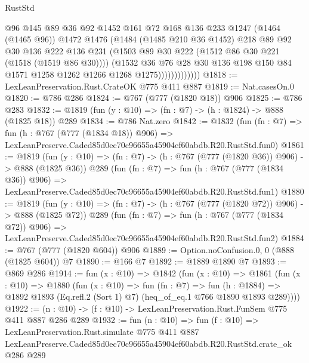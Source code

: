 \begin{lexlean}{RustStd}
\begin{coremodule}
                          @96
                          @145
                          @89
                          @36
                          @92
                          @1452
                          @161
                          @72
                          @168
                          @136
                          @233
                          @1247
                          (@1464 (@1465 @96))
                          @1472
                          @1476
                          (@1484
                            (@1485 @210 @36 @1452)
                            @218
                            @89
                            @92
                            @30
                            @136
                            @222
                            @136
                            @231
                            (@1503 @89 @30 @222 (@1512 @86 @30 @221 (@1518 (@1519 @86 @30))))
                            (@1532
                              @36
                              @76
                              @28
                              @30
                              @136
                              @198
                              @150
                              @84
                              @1571
                              @1258
                              @1262
                              @1266
                              @1268
                              @1275)))))))))))))
@1818 := LexLeanPreservation.Rust.CrateOK @775 @411 @887
@1819 := Nat.casesOn.{0}
@1820 := @786 @286
@1824 := @767 (@777 (@1820 @18)) @906
@1825 := @786 @283
@1832 := @1819 (fun (y : @10) => (fn : @7) -> (h : @1824) -> @888 (@1825 @18)) @289
@1834 := @786 Nat.zero
@1842 := @1832
    (fun (fn : @7) =>
    fun (h : @767 (@777 (@1834 @18)) @906) =>
    LexLeanPreserve.Caded85d0ec70c96655a45904ef60abdb.R20.RustStd.fun0)
@1861 := @1819
    (fun (y : @10) => (fn : @7) -> (h : @767 (@777 (@1820 @36)) @906) -> @888 (@1825 @36))
    @289
    (fun (fn : @7) =>
    fun (h : @767 (@777 (@1834 @36)) @906) =>
    LexLeanPreserve.Caded85d0ec70c96655a45904ef60abdb.R20.RustStd.fun1)
@1880 := @1819
    (fun (y : @10) => (fn : @7) -> (h : @767 (@777 (@1820 @72)) @906) -> @888 (@1825 @72))
    @289
    (fun (fn : @7) =>
    fun (h : @767 (@777 (@1834 @72)) @906) =>
    LexLeanPreserve.Caded85d0ec70c96655a45904ef60abdb.R20.RustStd.fun2)
@1884 := @767 (@777 (@1820 @604)) @906
@1889 := Option.noConfusion.{0, 0} (@888 (@1825 @604)) @7
@1890 := @166 @7
@1892 := @1889 @1890 @7
@1893 := @869 @286
@1914 := fun (x : @10) =>
  @1842
    (fun (x : @10) =>
    @1861
      (fun (x : @10) =>
      @1880
        (fun (x : @10) =>
        fun (fn : @7) =>
        fun (h : @1884) =>
        @1892 @1893 (Eq.refl.{2} (Sort 1) @7) (heq_of_eq.{1} @766 @1890 @1893 @289))))
@1922 := (n : @10) -> (f : @10) -> LexLeanPreservation.Rust.FunSem @775 @411 @887 @286 @289
@1932 := fun (n : @10) =>
  fun (f : @10) =>
  LexLeanPreservation.Rust.simulate
    @775
    @411
    @887
    LexLeanPreserve.Caded85d0ec70c96655a45904ef60abdb.R20.RustStd.crate_ok
    @286
    @289
\end{coremodule}
\end{lexlean}
